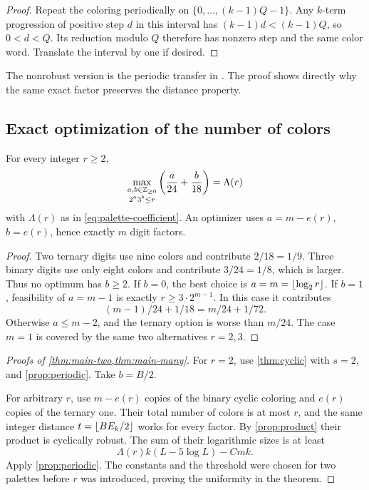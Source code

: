 \begin{proof}
Repeat the coloring periodically on
\(\{0,\ldots,(k-1)Q-1\}\).
Any \(k\)-term progression of positive step \(d\) in this interval
has \((k-1)d<(k-1)Q\), so \(0<d<Q\).
Its reduction modulo \(Q\) therefore has nonzero step and the same
color word. Translate the interval by one if desired.
\end{proof}

The nonrobust version is the periodic transfer in
\cite[Lemma 2]{camposFoxSchildkraut2026}. The proof shows directly why
the same exact factor preserves the distance property.

\subsection{Exact optimization of the number of colors}

\begin{proposition}
\label{prop:palette}
For every integer \(r\ge2\),
\begin{equation}\label{eq:palette-max}
 \max_{\substack{a,b\in\mathbb Z_{\ge0}\\2^a3^b\le r}}
 \left(\frac a{24}+\frac b{18}\right)
 =\Lambda(r)
\end{equation}
with \(\Lambda(r)\) as in \eqref{eq:palette-coefficient}.
An optimizer uses \(a=m-e(r)\), \(b=e(r)\), hence exactly \(m\)
digit factors.
\end{proposition}

\begin{proof}
Two ternary digits use nine colors and contribute \(2/18=1/9\).
Three binary digits use only eight colors and contribute \(3/24=1/8\),
which is larger. Thus no optimum has \(b\ge2\).
If \(b=0\), the best choice is \(a=m=\left\lfloor \log_2r\right\rfloor\).
If \(b=1\), feasibility of \(a=m-1\) is exactly
\(r\ge3\cdot2^{m-1}\). In this case it contributes
\[
 (m-1)/24+1/18=m/24+1/72.
\]
Otherwise \(a\le m-2\), and the ternary option is worse than \(m/24\).
The case \(m=1\) is covered by the same two alternatives \(r=2,3\).
\end{proof}

\begin{proof}[Proofs of \cref{thm:main-two,thm:main-many}]
For \(r=2\), use \cref{thm:cyclic} with \(s=2\), and
\cref{prop:periodic}. Take \(b=B/2\).

For arbitrary \(r\), use \(m-e(r)\) copies of the binary cyclic
coloring and \(e(r)\) copies of the ternary one.
Their total number of colors is at most \(r\), and the same integer
distance \(t=\left\lfloor BE_k/2\right\rfloor\) works for every factor.
By \cref{prop:product} their product is cyclically robust.
The sum of their logarithmic sizes is at least
\[
 \Lambda(r)k(L-5\log L)-Cmk.
\]
Apply \cref{prop:periodic}. The constants and the threshold were
chosen for two palettes before \(r\) was introduced, proving the
uniformity in the theorem.
\end{proof}

